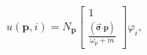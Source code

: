 \begin{equation}
u(\mathbf{p,}i)=N_{\mathbf{p}}\left[ 
\begin{array}{c}
1 \\ 
\frac{(\overrightarrow{\mathbf{\sigma }}\mathbf{\cdot p})}{\omega _{p}+m}
\end{array}
\right] \varphi _{i},
\end{equation}

